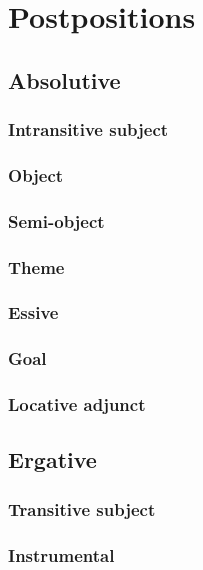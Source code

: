 \section{Postpositions} \label{ex:postpositions}

\subsection{Absolutive} \label{sec:absolutive}
\subsubsection{Intransitive subject}
\subsubsection{Object}
\subsubsection{Semi-object}
\subsubsection{Theme}
\subsubsection{Essive} \label{sec:essive.abs}
\subsubsection{Goal} \label{absolutive.goal}
\subsubsection{Locative adjunct} \label{absolutive.locative}

\subsection{Ergative} \label{sec:erg.kW}
\subsubsection{Transitive subject} \label{sec:A.kW}
\subsubsection{Instrumental} \label{sec:instr.kW}

